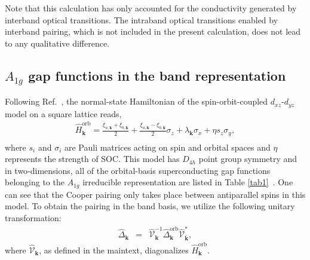 \documentclass[prl,floatfix,twocolumn,showpacs,amsmath,superscriptaddress]{revtex4-2}
\renewcommand{\vec}[1]{\mathbf{#1}}
\newcommand{\vk}{{\vec{k}}}
\begin{document}
Note that this calculation has only accounted for the conductivity generated by interband optical transitions. The intraband optical transitions enabled by interband pairing, which is not included in the present calculation, does not lead to any qualitative difference. 

\renewcommand{\theequation}{S\arabic{equation}}
\setcounter{equation}{0}
\subsection{$A_{1g}$ gap functions in the band representation}
Following Ref.~\cite{ref3}, the normal-state Hamiltonian of the spin-orbit-coupled $d_{xz}$-$d_{yz}$ model on a square lattice reads, 
\begin{eqnarray}\hat{H}^\text{orb}_\vk=\frac{\xi_{a,\vk}+\xi_{b,\vk}}{2}+\frac{\xi_{a,\vk}-\xi_{b,\vk}}{2} \sigma_z +\lambda_{\vk}\sigma_x+\eta s_z \sigma_y, \nonumber \\
\end{eqnarray}
where $s_i$ and $\sigma_i$ are Pauli matrices acting on spin and orbital spaces and $\eta$ represents the strength of SOC. This model has $D_{4h}$ point group symmetry and in two-dimensions, all of the orbital-basis superconducting gap functions belonging to the $A_{1g}$ irreducible representation are listed in Table \ref{tab1}~\cite{ref3}. One can see that the Cooper pairing only takes place between antiparallel spins in this model. To obtain the pairing in the band basis, we utilize the following unitary transformation:
\begin{eqnarray}
	\hat{\Delta}_\vk&=&\hat{\mathcal{V}}^{-1}_\vk \hat{\Delta}^\text{orb}_\vk \hat{\mathcal{V}}^*_{\bar{\vk}},
\end{eqnarray}
where $\hat{\mathcal{V}}_\vk$, as defined in the maintext, diagonalizes $\hat{H}^\text{orb}_\vk$. 
\end{document}
